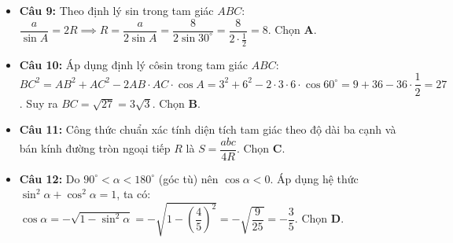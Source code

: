 \documentclass[12pt,a4paper]{article}
\begin{document}
\begin{itemize}[leftmargin=0.6cm, itemsep=2.5pt, topsep=1pt]
\item \textbf{Câu 9:} Theo định lý sin trong tam giác $ABC$:
$\dfrac{a}{\sin A} = 2R \implies R = \dfrac{a}{2\sin A} = \dfrac{8}{2\sin 30^\circ} = \dfrac{8}{2 \cdot \frac{1}{2}} = 8$. Chọn \textbf{A}.

\item \textbf{Câu 10:} Áp dụng định lý côsin trong tam giác $ABC$:
$BC^2 = AB^2 + AC^2 - 2AB \cdot AC \cdot \cos A = 3^2 + 6^2 - 2 \cdot 3 \cdot 6 \cdot \cos 60^\circ = 9 + 36 - 36 \cdot \dfrac{1}{2} = 27$.
Suy ra $BC = \sqrt{27} = 3\sqrt{3}$. Chọn \textbf{B}.

\item \textbf{Câu 11:} Công thức chuẩn xác tính diện tích tam giác theo độ dài ba cạnh và bán kính đường tròn ngoại tiếp $R$ là $S = \dfrac{abc}{4R}$. Chọn \textbf{C}.

\item \textbf{Câu 12:} Do $90^\circ < \alpha < 180^\circ$ (góc tù) nên $\cos \alpha < 0$. Áp dụng hệ thức $\sin^2 \alpha + \cos^2 \alpha = 1$, ta có:
$\cos \alpha = -\sqrt{1 - \sin^2 \alpha} = -\sqrt{1 - \left(\dfrac{4}{5}\right)^2} = -\sqrt{\dfrac{9}{25}} = -\dfrac{3}{5}$. Chọn \textbf{D}.
\end{itemize}
\end{document}

